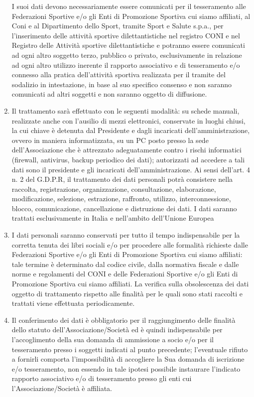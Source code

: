 \documentclass{djtsmod}
\begin{document}
\begin{enumerate}[wide, labelindent = 0pt, noitemsep, topsep = 0pt]
		I suoi dati devono necessariamente essere comunicati per il tesseramento alle Federazioni Sportive e/o gli Enti di Promozione Sportiva cui siamo affiliati, al Coni e al Dipartimento dello Sport, tramite Sport e Salute s.p.a., per l'inserimento delle attività sportive dilettantistiche nel registro CONI e nel Registro delle Attività sportive dilettantistiche e potranno essere comunicati ad ogni altro soggetto terzo, pubblico o privato, esclusivamente in relazione ad ogni altro utilizzo inerente il rapporto associativo e di tesseramento e/o connesso alla pratica dell'attività sportiva realizzata per il tramite del sodalizio in intestazione,  in base al suo specifico consenso e non saranno comunicati ad altri soggetti e non saranno oggetto di diffusione.
		\item Il trattamento sarà effettuato con le seguenti modalità: su schede manuali, realizzate anche con l'ausilio di mezzi elettronici, conservate in luoghi chiusi, la cui chiave è detenuta dal Presidente e dagli incaricati dell'amministrazione, ovvero in maniera informatizzata, su un PC posto presso la sede dell'Associazione che è attrezzato adeguatamente contro i rischi informatici (firewall, antivirus, backup periodico dei dati); autorizzati ad accedere a tali dati sono il presidente e gli incaricati dell'amministrazione. Ai sensi dell'art. 4 n. 2 del G.D.P.R, il trattamento dei dati personali potrà consistere nella raccolta, registrazione, organizzazione, consultazione, elaborazione, modificazione, selezione, estrazione, raffronto, utilizzo, interconnessione, blocco, comunicazione, cancellazione e distruzione dei dati. I dati saranno trattati esclusivamente in Italia e nell'ambito dell'Unione Europea
		\item I dati personali saranno conservati per tutto il tempo indispensabile per la corretta tenuta dei libri sociali e/o per procedere alle formalità richieste dalle Federazioni Sportive e/o gli Enti di Promozione Sportiva cui siamo affiliati: tale termine è determinato dal codice civile, dalla normativa fiscale e dalle norme e regolamenti del CONI e delle Federazioni Sportive e/o gli Enti di Promozione Sportiva cui siamo affiliati. La verifica sulla obsolescenza dei dati oggetto di trattamento rispetto alle finalità per le quali sono stati raccolti e trattati viene effettuata periodicamente.
		\item Il conferimento dei dati è obbligatorio per il raggiungimento delle finalità dello statuto dell'Associazione/Società ed è quindi indispensabile per l'accoglimento della sua domanda di ammissione a socio e/o per il tesseramento presso i soggetti indicati al punto precedente; l'eventuale rifiuto a fornirli comporta  l'impossibilità di accogliere la Sua domanda di iscrizione e/o tesseramento, non essendo in tale ipotesi possibile instaurare l'indicato rapporto associativo e/o di tesseramento presso gli enti cui l'Associazione/Società è affiliata.

\end{enumerate}
\end{document}
